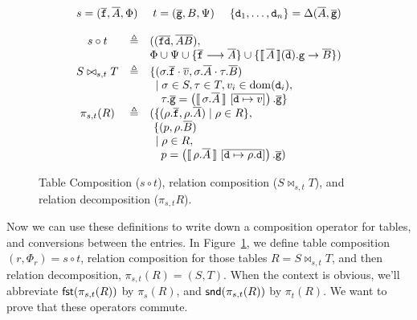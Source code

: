 \begin{figure}[tpb]
  \[\begin{array}{ccl}
      \multicolumn 3 c
      {s = (\vec{\var f},\vec A, \Phi)\hfill t = (\vec{\var g},B, \Psi) \hfill \{\var d_1, \ldots, \var d_n\} = \Delta(\vec A, \vec{\var g})}\\\\
      s \circ t
      & \triangleq
      & ((\vec{\var f}\vec{\var d}, \vec A\vec B),\\
      && \Phi \cup \Psi \cup \{\vec{\var f} \longrightarrow \vec A\} \cup \{ \bracbb{\vec A}(\vec{\var d}).\var g \to \vec B \})\\[.2em]
      S \bowtie_{s,t}T
      & \triangleq
      & \{(\sigma.\vec{\var f}\cdot\vec v,\sigma.\vec A \cdot\tau.\vec B) \\
      && \hspace{.5em}
         \mid \sigma \in S, \tau \in T, v_i \in \dom(\var d_i), \\
      && \hspace{1em}
         \tau.\vec{\var g} = \left(\bracbb{\sigma.\vec A}~[\overline{\var d \mapsto v}]\right).\vec{\var g}%
         \}\\        
      \pi_{s,t}(R)
      & \triangleq
      & (\{(\rho.\vec{\var f},\rho.\vec A) \mid \rho \in R\}, \\
      && ~\{(p, \rho.\vec B) \\
      && \hspace{.5em} \mid \rho \in R, \\
      && \hspace{1em} p = \left(\bracbb{\rho.\vec A}~[\overline{\var d \mapsto \rho.\var d}] \right).\vec{\var g})
    \end{array}
  \]  
  \caption{Table Composition ($s \circ t$), relation composition
    ($S \bowtie_{s,t}T$), and relation decomposition ($\pi_{s,t}R$).}
  \label{fig:compose-tables}
\end{figure}

Now we can use these definitions to write down a composition operator
for tables, and conversions between the entries. In
Figure~\ref{fig:compose-tables}, we define table composition
$(r,\Phi_r) = s \circ t$, relation composition for those tables
$R = S \bowtie_{s,t} T$, and then relation decomposition,
$\pi_{s,t}(R) = (S,T)$. When the context is obvious, we'll abbreviate
$\mathsf{fst}(\pi_{s,t}(R))$ by $\pi_{s}(R)$, and $\mathsf{snd}(\pi_{s,t}(R))$ by
$\pi_t(R)$. We want to prove that these operators commute.

